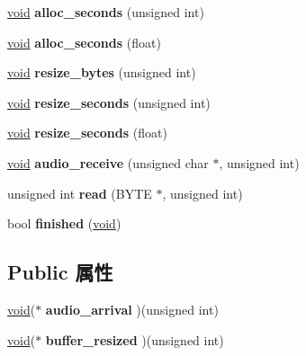 \begin{DoxyCompactItemize}
\hyperlink{interfacevoid}{void} {\bfseries alloc\+\_\+seconds} (unsigned int)
\item 
\mbox{\label{classaudio__membuffer_afda019fbb7630d16b5c037b1e7eb87b4}} 
\hyperlink{interfacevoid}{void} {\bfseries alloc\+\_\+seconds} (float)
\item 
\mbox{\label{classaudio__membuffer_aa4d82562fc66d9f7bf776917c0e39b1c}} 
\hyperlink{interfacevoid}{void} {\bfseries resize\+\_\+bytes} (unsigned int)
\item 
\mbox{\label{classaudio__membuffer_aa8275a2a0700d7dbd358b63ab1d0acb8}} 
\hyperlink{interfacevoid}{void} {\bfseries resize\+\_\+seconds} (unsigned int)
\item 
\mbox{\label{classaudio__membuffer_aef6998c59a826de99706c15baa3b506d}} 
\hyperlink{interfacevoid}{void} {\bfseries resize\+\_\+seconds} (float)
\item 
\mbox{\label{classaudio__membuffer_a26fe3442c9d6890e5147ec272fd6f729}} 
\hyperlink{interfacevoid}{void} {\bfseries audio\+\_\+receive} (unsigned char $\ast$, unsigned int)
\item 
\mbox{\label{classaudio__membuffer_a205228562bf49674afe359860cdd64e0}} 
unsigned int {\bfseries read} (B\+Y\+TE $\ast$, unsigned int)
\item 
\mbox{\label{classaudio__membuffer_a69cf5ed94b6952def5fc7a6d2179de34}} 
bool {\bfseries finished} (\hyperlink{interfacevoid}{void})
\end{DoxyCompactItemize}
\subsection*{Public 属性}
\begin{DoxyCompactItemize}
\item 
\mbox{\label{classaudio__membuffer_ad4b83e3a909e1f865fe94a540c5aaea8}} 
\hyperlink{interfacevoid}{void}($\ast$ {\bfseries audio\+\_\+arrival} )(unsigned int)
\item 
\mbox{\label{classaudio__membuffer_a18848cfe6b72916885099ab848c3ccb5}} 
\hyperlink{interfacevoid}{void}($\ast$ {\bfseries buffer\+\_\+resized} )(unsigned int)
\end{DoxyCompactItemize}
